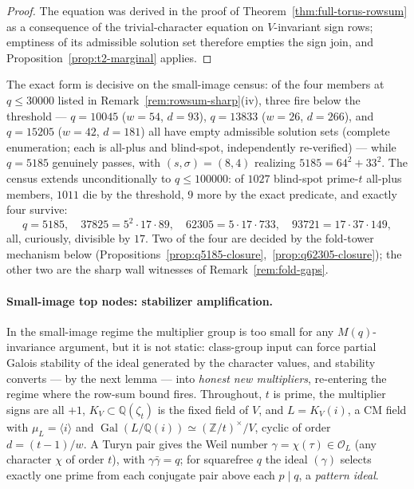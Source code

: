 \documentclass[11pt]{article}
\theoremstyle{plain}
\theoremstyle{definition}
\theoremstyle{remark}
\newcommand{\Z}{\mathbb Z}
\newcommand{\Q}{\mathbb Q}
\newcommand{\Gal}{\operatorname{Gal}}
\begin{document}
\begin{proof}
The equation was derived in the proof of
Theorem~\ref{thm:full-torus-rowsum} as a consequence of the
trivial-character equation on $V$-invariant sign rows; emptiness of its
admissible solution set therefore empties the sign join, and
Proposition~\ref{prop:t2-marginal} applies.
\end{proof}

The exact form is decisive on the small-image census: of the four
members at $q\le30000$ listed in Remark~\ref{rem:rowsum-sharp}(iv),
three fire below the threshold --- $q=10045$ ($w=54$, $d=93$),
$q=13833$ ($w=26$, $d=266$), and $q=15205$ ($w=42$, $d=181$) all have
empty admissible solution sets (complete enumeration; each is all-plus
and blind-spot, independently re-verified) --- while $q=5185$ genuinely
passes, with $(s,\sigma)=(8,4)$ realizing $5185=64^2+33^2$.  The census
extends unconditionally to $q\le100000$: of $1027$ blind-spot prime-$t$
all-plus members, $1011$ die by the threshold, $9$ more by the exact
predicate, and exactly four survive:
\[
  q=5185,\quad 37825=5^2\cdot17\cdot89,\quad
  62305=5\cdot17\cdot733,\quad 93721=17\cdot37\cdot149,
\]
all, curiously, divisible by $17$.  Two of the four are decided by the
fold-tower mechanism below
(Propositions~\ref{prop:q5185-closure},~\ref{prop:q62305-closure}); the
other two are the sharp wall witnesses of
Remark~\ref{rem:fold-gaps}.

\paragraph{Small-image top nodes: stabilizer amplification.}
In the small-image regime the multiplier group is too small for any
$M(q)$-invariance argument, but it is not static: class-group input can
force partial Galois stability of the ideal generated by the character
values, and stability converts --- by the next lemma --- into
\emph{honest new multipliers}, re-entering the regime where the row-sum
bound fires.  Throughout, $t$ is prime, the multiplier signs are all
$+1$, $K_V\subset\Q(\zeta_t)$ is the fixed field of $V$, and
$L=K_V(i)$, a CM field with $\mu_L=\langle i\rangle$ and
$\Gal(L/\Q(i))\simeq(\Z/t)^\times/V$, cyclic of order
$d=(t-1)/w$.  A Turyn pair gives the
Weil number $\gamma=\chi(\tau)\in\mathcal O_L$ (any character $\chi$ of
order $t$), with $\gamma\bar\gamma=q$; for squarefree $q$ the ideal
$(\gamma)$ selects exactly one prime from each conjugate pair above each
$p\mid q$, a \emph{pattern ideal}.
\end{document}
